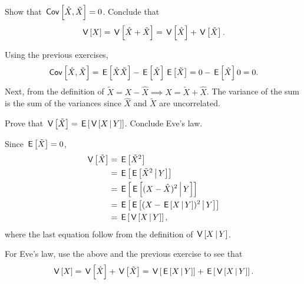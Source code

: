 \documentclass[assignments]{subfiles}
\begin{document}
\begin{exercise}
Show that $\cov{\hat X, \tilde X} = 0$. Conclude that
\begin{equation}
\label{eq:8}
\V{X} = \V{\hat X + \tilde X} = \V{\hat X} + \V{\tilde X}.
\end{equation}
\begin{solution}
Using the previous exercises,
\begin{equation}
\label{eq:7}
\cov{\hat X, \tilde X} = \E{\hat X \tilde X} - \E{\hat X} \E{\tilde X} = 0 - \E{\hat X} 0 = 0.
\end{equation}
Next, from the definition of $\tilde X = X - \hat X \implies X = \tilde X + \hat X$.
The variance of the sum is the sum of the variances since $\hat X$ and $\tilde X$ are uncorrelated.
\end{solution}
\end{exercise}

\begin{exercise}
Prove that $\V{\tilde X} = \E{\V{X\given Y}}$. Conclude Eve's law.
\begin{solution}
Since $\E{\tilde X} = 0$,
\begin{align}
\label{eq:9}
\V{\tilde X} &= \E{\tilde X^{2}}  \\
&= \E{\E{\tilde X^{2}\given Y}} \\
&= \E{\E{(X - \hat X)^{2}\given Y}} \\
&= \E{\E{(X - \E{X\given Y})^{2}\given Y}} \\
&= \E{\V{X\given Y}},
\end{align}
where the last equation follow from the definition of $\V{X\given Y}$.

For Eve's law, use the above and the previous exercise to see that
\begin{equation}
\label{eq:10}
\V{X} = \V{\hat X} + \V{\tilde X} = \V{\E{X\given Y}} + \E{\V{X\given Y}}.
\end{equation}
\end{solution}
\end{exercise}
\end{document}
